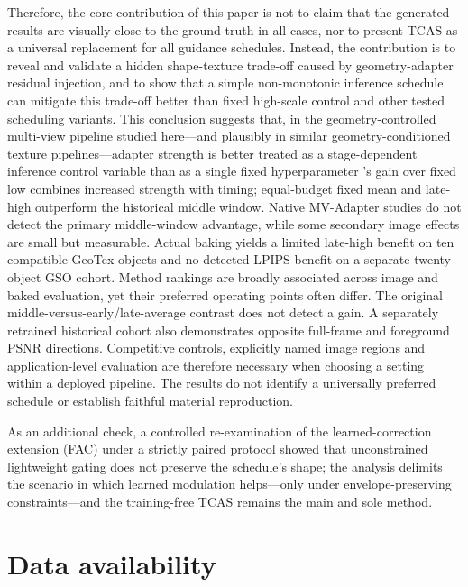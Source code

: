 \documentclass[times,twocolumn,final]{elsarticle}
\providecommand{\DIFadd}[1]{{\protect\color{blue} \sf #1}} %
\providecommand{\DIFdel}[1]{{\protect\color{red} \scriptsize #1}} %
\providecommand{\DIFaddbegin}{} %
\providecommand{\DIFaddend}{} %
\providecommand{\DIFdelbegin}{} %
\providecommand{\DIFdelend}{} %
\begin{document}
\DIFdel{Therefore, the core contribution of this paper is not to claim that the generated results are visually close to the ground truth in all cases, nor to present TCAS as a universal replacement for all guidance schedules. Instead, the contribution is to reveal and validate a hidden shape-texture trade-off caused by geometry-adapter residual injection, and to show that a simple non-monotonic inference schedule can mitigate this trade-off better than fixed high-scale control and other tested scheduling variants. This conclusion suggests that, in the geometry-controlled multi-view pipeline studied here---and plausibly in similar geometry-conditioned texture pipelines---adapter strength is better treated as a stage-dependent inference control variable than as a single fixed hyperparameter}\DIFdelend \DIFaddbegin \DIFadd{'s gain over fixed low combines increased strength with timing; equal-budget fixed mean and late-high outperform the historical middle window. Native MV-Adapter studies do not detect the primary middle-window advantage, while some secondary image effects are small but measurable. Actual baking yields a limited late-high benefit on ten compatible GeoTex objects and no detected LPIPS benefit on a separate twenty-object GSO cohort. Method rankings are broadly associated across image and baked evaluation, yet their preferred operating points often differ. The original middle-versus-early/late-average contrast does not detect a gain. A separately retrained historical cohort also demonstrates opposite full-frame and foreground PSNR directions. Competitive controls, explicitly named image regions and application-level evaluation are therefore necessary when choosing a setting within a deployed pipeline. The results do not identify a universally preferred schedule or establish faithful material reproduction}\DIFaddend .

\DIFdelbegin \DIFdel{As an additional check, a controlled re-examination of the learned-correction extension (FAC) under a strictly paired protocol showed that unconstrained lightweight gating does not preserve the schedule's shape; the analysis delimits the scenario in which learned modulation helps---only under envelope-preserving constraints---and the training-free TCAS remains the main and sole method. }%

\DIFdelend \section*{Data availability}
\end{document}
